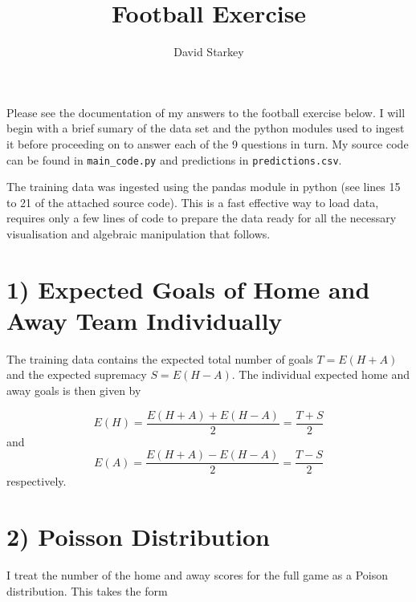 \documentclass[10pt]{article}
\begin{document}
\title{Football Exercise}

\author{David Starkey}

\maketitle






Please see the documentation of my answers to the football exercise below. I will begin with a brief sumary of the data set and the python modules used to ingest it before proceeding on to answer each of the 9 questions in turn. My source code can be found in \verb|main_code.py| and predictions in \verb|predictions.csv|.  

The training data was ingested using the pandas module in python (see lines 15 to 21 of the attached source code). This is a fast effective way to load data, requires only a few lines of code to prepare the data ready for all the necessary visualisation and algebraic manipulation that follows.



\section{1) Expected Goals of Home and Away Team Individually}
\label{sec_1}

The training data contains the expected total number of goals $T = E(H+A)$ and the expected supremacy $S = E(H-A)$. The individual expected home and away goals is then given by 

\begin{equation}
\label{eq_h_expected}
E(H) = \frac{E(H+A) + E(H-A)}{2} = \frac{T+S}{2}
\end{equation}
\noindent and
\begin{equation}
\label{eq_a_expected}
E(A) = \frac{E(H+A) - E(H-A)}{2} = \frac{T-S}{2}
\end{equation}
\noindent respectively.





\section{2) Poisson Distribution}
\label{sec_poisson}

I treat the number of the home and away scores for the full game as a Poison distribution. This takes the form
\end{document}

